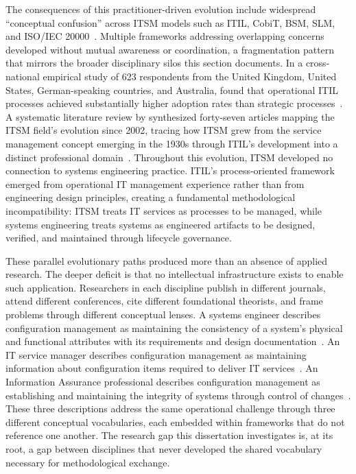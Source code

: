 The consequences of this practitioner-driven evolution include widespread ``conceptual confusion'' across ITSM models such as ITIL, CobiT, BSM, SLM, and ISO/IEC 20000~\parencite{Winniford_2009}. Multiple frameworks addressing overlapping concerns developed without mutual awareness or coordination, a fragmentation pattern that mirrors the broader disciplinary silos this section documents. In a cross-national empirical study of 623 respondents from the United Kingdom, United States, German-speaking countries, and Australia, \citeauthor{Marrone_2014} found that operational ITIL processes achieved substantially higher adoption rates than strategic processes~\parencite{Marrone_2014}. A systematic literature review by \citeauthor{Serrano_2021} synthesized forty-seven articles mapping the ITSM field's evolution since 2002, tracing how ITSM grew from the service management concept emerging in the 1930s through ITIL's development into a distinct professional domain~\parencite{Serrano_2021}. Throughout this evolution, ITSM developed no connection to systems engineering practice. ITIL's process-oriented framework emerged from operational IT management experience rather than from engineering design principles, creating a fundamental methodological incompatibility: ITSM treats IT services as processes to be managed, while systems engineering treats systems as engineered artifacts to be designed, verified, and maintained through lifecycle governance.

These parallel evolutionary paths produced more than an absence of applied research. The deeper deficit is that no intellectual infrastructure exists to enable such application. Researchers in each discipline publish in different journals, attend different conferences, cite different foundational theorists, and frame problems through different conceptual lenses. A systems engineer describes configuration management as maintaining the consistency of a system's physical and functional attributes with its requirements and design documentation~\parencite{SEBoK_2024}. An IT service manager describes configuration management as maintaining information about configuration items required to deliver IT services~\parencite{ITIL_4_2019}. An Information Assurance professional describes configuration management as establishing and maintaining the integrity of systems through control of changes~\parencite{NIST_SP_800_128}. These three descriptions address the same operational challenge through three different conceptual vocabularies, each embedded within frameworks that do not reference one another. The research gap this dissertation investigates is, at its root, a gap between disciplines that never developed the shared vocabulary necessary for methodological exchange.

